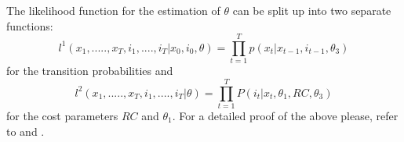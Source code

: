 \documentclass[a4paper,12pt,bold]{scrartcl}
\begin{document}
The likelihood function for the estimation of \(\theta\) can be split up into two separate functions:
\begin{equation}
  l^1(x_1, .....,  x_T, i_1, ...., i_T | x_0, i_0, \theta) = \prod_{t = 1}^T p(x_t | x_{t-1}, i_{t-1}, \theta_3)
\end{equation}
for the transition probabilities and
\begin{equation}
  l^2(x_1, .....,  x_T, i_1, ...., i_T | \theta) = \prod_{t = 1}^T P(i_t | x_t, \theta_1, RC, \theta_3)
\end{equation}
for the cost parameters $RC$ and \(\theta_1\).
For a detailed proof of the above please, refer to \cite{Rust.1987} and \cite{Rust.1988}.

\newpage


\end{document}
